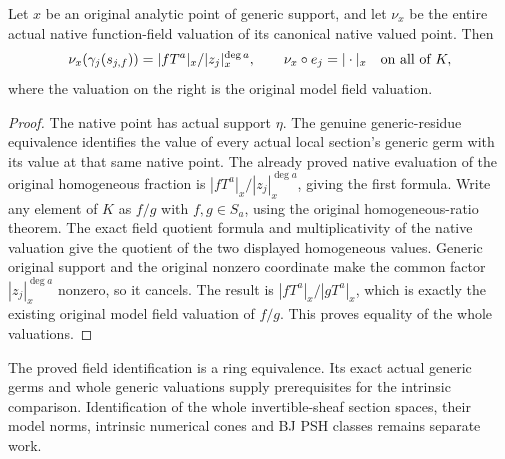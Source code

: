 \begin{theorem}
\label{thm:seven-native-original-whole-field-valuation}
\leanok
Let $x$ be an original analytic point of generic support, and let $\nu_x$
be the entire actual native function-field valuation of its canonical
native valued point. Then
\[
 \nu_x(\gamma_j(s_{j,f}))=|fT^a|_x/|z_j|_x^{\deg a},\qquad
 \nu_x\circ e_j=|\cdot|_x\quad\hbox{on all of }K,
\]
where the valuation on the right is the original model field valuation.
\end{theorem}
\begin{proof}
The native point has actual support $\eta$. The genuine generic-residue
equivalence identifies the value of every actual local section's generic
germ with its value at that same native point. The already proved native
evaluation of the original homogeneous fraction is
$|fT^a|_x/|z_j|_x^{\deg a}$, giving the first formula. Write any element of
$K$ as $f/g$ with $f,g\in S_a$, using the original homogeneous-ratio theorem.
The exact field quotient formula and multiplicativity of the native
valuation give the quotient of the two displayed homogeneous values.
Generic original support and the original nonzero coordinate make the
common factor $|z_j|_x^{\deg a}$ nonzero, so it cancels. The result is
$|fT^a|_x/|gT^a|_x$, which is exactly the existing original model field
valuation of $f/g$. This proves equality of the whole valuations.
\end{proof}

\begin{remark}
The proved field identification is a ring equivalence. Its exact actual
generic germs and whole generic valuations supply prerequisites for the
intrinsic comparison. Identification of the whole invertible-sheaf section
spaces, their model norms, intrinsic numerical cones and BJ PSH classes
remains separate work.
\end{remark}


